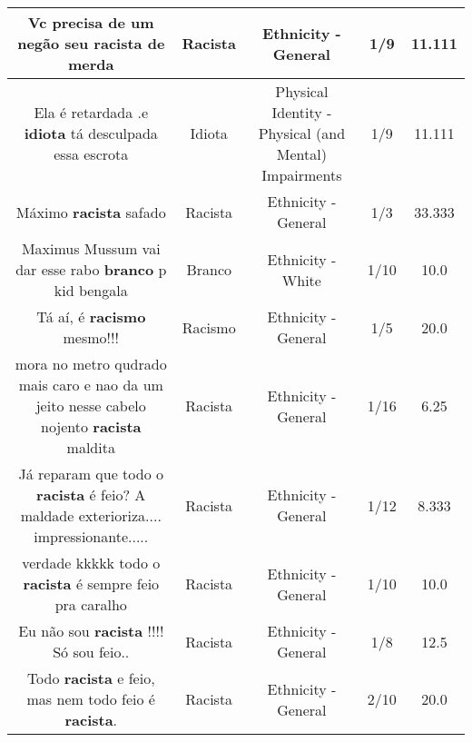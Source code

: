 \documentclass[11pt]{article}
\newlength\mylength
\begin{document}
\begin{center}
\begin{longtable}{|C{.65\mylength}|C{.30\mylength}|C{.12\mylength}|C{.12\mylength}|C{.12\mylength}|}
  \small Vc precisa de um negão seu \textbf{racista} de merda\normalsize   & Racista & Ethnicity - General & 1/9 & 11.111 \\  \hline
  \small Ela é retardada .e \textbf{idiota} tá desculpada essa escrota\normalsize   & Idiota & Physical Identity - Physical (and Mental) Impairments & 1/9 & 11.111 \\  \hline
  \small Máximo \textbf{racista} safado\normalsize   & Racista & Ethnicity - General & 1/3 & 33.333 \\  \hline
  \small Maximus Mussum vai dar esse rabo \textbf{branco} p kid bengala\normalsize   & Branco & Ethnicity - White & 1/10 & 10.0 \\  \hline
  \small Tá aí, é \textbf{racismo} mesmo!!!\normalsize   & Racismo & Ethnicity - General & 1/5 & 20.0 \\  \hline
  \small mora no metro qudrado mais caro e nao da um jeito nesse cabelo nojento \textbf{racista} maldita\normalsize   & Racista & Ethnicity - General & 1/16 & 6.25 \\  \hline
  \small Já reparam que todo o \textbf{racista} é feio? A maldade exterioriza.... impressionante.....\normalsize   & Racista & Ethnicity - General & 1/12 & 8.333 \\  \hline
  \small verdade kkkkk todo o \textbf{racista} é sempre feio pra caralho\normalsize   & Racista & Ethnicity - General & 1/10 & 10.0 \\  \hline
  \small Eu não sou \textbf{racista} !!!! Só sou feio..\normalsize   & Racista & Ethnicity - General & 1/8 & 12.5 \\  \hline
  \small Todo \textbf{racista} e feio, mas nem todo feio é \textbf{racista}.\normalsize   & Racista & Ethnicity - General & 2/10 & 20.0 \\  \hline

\end{longtable}
\end{center}
\end{document}
